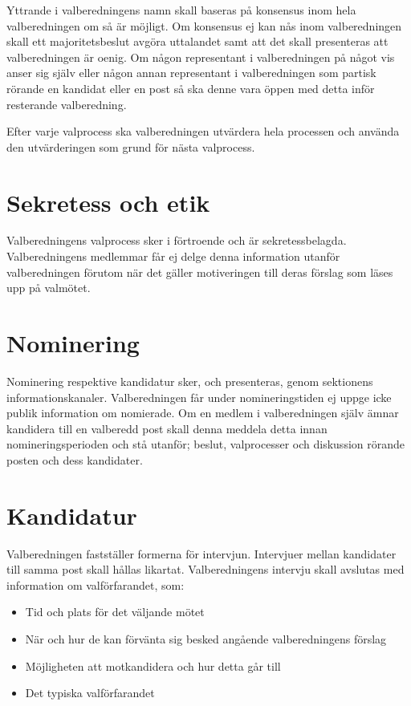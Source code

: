 \documentclass{dsekprotokoll}
\begin{document}
Yttrande i valberedningens namn skall baseras på konsensus inom hela valberedningen om
så är möjligt. Om konsensus ej kan nås inom valberedningen skall ett majoritetsbeslut avgöra
uttalandet samt att det skall presenteras att valberedningen är oenig.
Om någon representant i valberedningen på något vis anser sig själv eller någon annan representant i valberedningen som partisk rörande en kandidat eller en post så ska denne vara
öppen med detta inför resterande valberedning.


Efter varje valprocess ska valberedningen utvärdera hela processen och använda den utvärderingen som grund för nästa valprocess.

\section{Sekretess och etik}
Valberedningens valprocess sker i förtroende och är sekretessbelagda. Valberedningens medlemmar får ej delge denna information
utanför valberedningen förutom när det gäller motiveringen till deras förslag som läses
upp på valmötet.

\section{Nominering}
Nominering respektive kandidatur sker, och presenteras, genom sektionens informationskanaler. Valberedningen får under nomineringstiden ej uppge icke publik information om nomierade. Om en medlem i valberedningen själv ämnar kandidera till en valberedd post skall
denna meddela detta innan nomineringsperioden och stå utanför; beslut, valprocesser och diskussion rörande posten och dess kandidater.

\section{Kandidatur}
Valberedningen fastställer formerna för intervjun. Intervjuer mellan kandidater till samma post
skall hållas likartat. Valberedningens intervju skall avslutas med information om valförfarandet, som:
\begin{itemize}
	\item Tid och plats för det väljande mötet
	\item När och hur de kan förvänta sig besked angående valberedningens förslag
	\item Möjligheten att motkandidera och hur detta går till
	\item Det typiska valförfarandet
\end{itemize}
\end{document}
